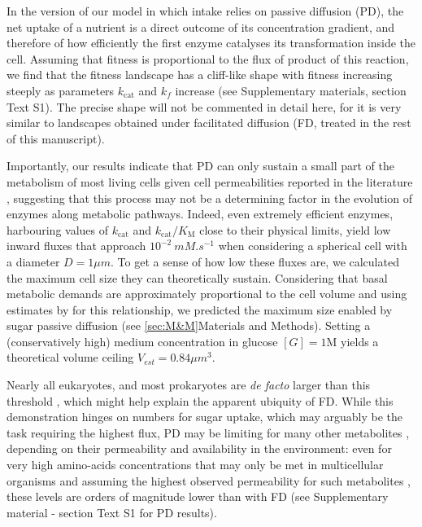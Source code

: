 \documentclass[11pt,onecolumn]{article}
\begin{document}
In the version of our model in which intake relies on passive diffusion (PD), the net uptake of a nutrient is a direct outcome of its concentration gradient, and therefore of how efficiently the first enzyme catalyses its transformation inside the cell. Assuming that fitness is proportional to the flux of product of this reaction, we find that the fitness landscape has a cliff-like shape with fitness increasing steeply as parameters $k_\text{cat}$ and $k_f$ increase (see Supplementary materials, section Text S1). The precise shape will not be commented in detail here, for it is very similar to landscapes obtained under facilitated diffusion (FD, treated in the rest of this manuscript). 

Importantly, our results indicate that PD can only sustain a small part of the metabolism of most living cells given cell permeabilities reported in the literature \citep{Wood68,Milo10}, suggesting that this process may not be a determining factor in the evolution of enzymes along metabolic pathways. Indeed, even extremely efficient enzymes, harbouring values of $k_\text{cat}$ and $k_\text{cat}/K_\text{M}$ close to their physical limits, yield low inward fluxes that approach $10^{-2}~mM.s^{-1}$ when considering a spherical cell with a diameter $D=1 \mu m$. To get a sense of how low these fluxes are, we calculated the maximum cell size they can theoretically sustain. Considering that basal metabolic demands are approximately proportional to the cell volume and using estimates by \citet{Lynch15} for this relationship, we predicted the maximum size enabled by sugar passive diffusion (see \ref{sec:M&M}Materials and Methods). Setting a (conservatively high) medium concentration in glucose $[G]=1$M yields a theoretical volume ceiling $V_{est}=0.84 \mu m^3$. 

Nearly all eukaryotes, and most prokaryotes are \textit{de facto} larger than this threshold \citep{Heim17}, which might help explain the apparent ubiquity of FD. While this demonstration hinges on numbers for sugar uptake, which may arguably be the task requiring the highest flux, PD may be limiting for many other metabolites \citep{Boer10}, depending on their permeability and availability in the environment: even for very high amino-acids concentrations that may only be met in multicellular organisms \citep{Schmidt16} and assuming the highest observed permeability for such metabolites \citep{Chakrabarti94}, these levels are orders of magnitude lower than with FD (see Supplementary material - section Text S1 for PD results). 
\end{document}
